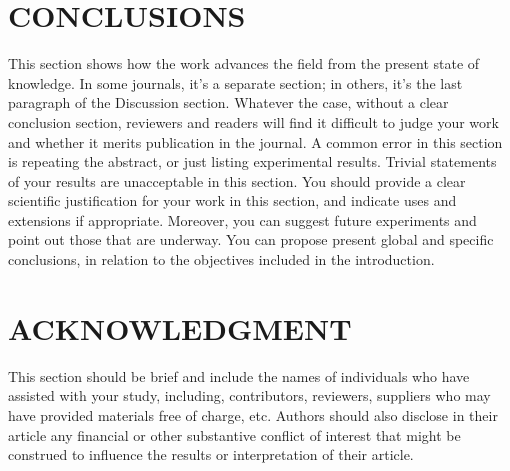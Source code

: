 \documentclass[a4paper, 10pt, conference]{ieeeconf}      %
\begin{document}
\section{CONCLUSIONS}
This section shows how the work advances the field from the present state of knowledge. In some journals, it's a separate section; in others, it's the last paragraph of the Discussion section. Whatever the case, without a clear conclusion section, reviewers and readers will find it difficult to judge your work and whether it merits publication in the journal.
A common error in this section is repeating the abstract, or just listing experimental results. Trivial statements of your results are unacceptable in this section.
You should provide a clear scientific justification for your work in this section, and indicate uses and extensions if appropriate. Moreover, you can suggest future experiments and point out those that are underway.
You can propose present global and specific conclusions, in relation to the objectives included in the introduction. 









\section*{ACKNOWLEDGMENT}

This section should be brief and include the names of individuals who have assisted with your study, including, contributors, reviewers, suppliers who may have provided materials free of charge, etc. Authors should also disclose in their article any financial or other substantive conflict of interest that might be construed to influence the results or interpretation of their article.
\end{document}

